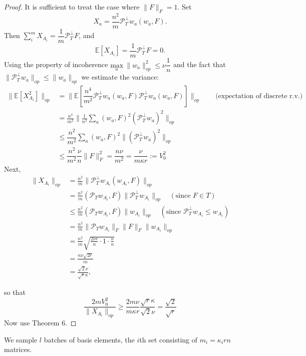 \documentclass{article}
\begin{document}
\begin{proof}
It is sufficient to treat the case where $\|F\|_F=1$. Set
\[
X_a = \dfrac{n^2}{m}\mathcal{P}_T^\perp w_a(w_a,F).
\]
Then $\sum_i^m X_{A_i} = \dfrac{1}{m}\mathcal{P}_T^\perp F$, and
\[
\mathbb{E}[X_{A_i}] =  \dfrac{1}{m}\mathcal{P}_T^\perp F=0.
\]
Using the property of incoherence $\underset{a} {\mathrm{max}} ~\|w_a\|_{op}^2 \le \nu \dfrac{1}{n}$ and the fact that $\|\mathcal{P}_T^\perp w_a\|_{op} \le \|w_a\|_{op}$ we estimate the variance:
\begin{equation}
\begin{aligned}
\|\mathbb{E}[X_{A_i}^2]\|_{op} &=\|\mathbb{E}[\dfrac{n^4}{m^2}\mathcal{P}_T^\perp w_a(w_a,F)\mathcal{P}_T^\perp w_a(w_a,F)]\|_{op}\qquad \text{(expectation of discrete r.v.)}\\
& = \frac{n^4}{m^2}\|\frac{1}{n^2}\sum_a(w_a,F)^2(\mathcal{P}_T^\perp w_a)^2\|_{op}\\
& \le \dfrac{n^2}{m^2}\sum_a(w_a,F)^2\|(\mathcal{P}_T^\perp w_a)^2\|_{op} \\
& \le \dfrac{n^2}{m^2}\dfrac{\nu}{n}\|F\|_F^2 = \dfrac{n\nu}{m^2} = \dfrac{\nu}{m\kappa r} := V_0^2
\end{aligned}
\label{eq:37}
\end{equation}
Next,
\begin{equation}
\begin{aligned}
\|X_{A_i}\|_{op} &= \frac{n^2}{m}\|\mathcal{P}_T^\perp w_{A_i}(w_{A_i},F)\|_{op}\\
&=\frac{n^2}{m}(\mathcal{P}_T w_{A_i},F)\|\mathcal{P}_T^\perp w_{A_i}\|_{op} \quad (\text{since }F\in T)\\
&\le\frac{n^2}{m}(\mathcal{P}_T w_{A_i},F)\|w_{A_i}\|_{op} \quad (\text{since }\mathcal{P}_T^\perp w_{A_i} \le w_{A_i})\\
&=\frac{n^2}{m}\|\mathcal{P}_T w_{A_i}\|_F\|F\|_F\|w_{A_i}\|_{op}\\
&= \frac{n^2}{m}\sqrt{\frac{2\nu r}{n}\cdot 1\cdot \frac{\nu}{n}}\\
&=\frac{n\nu \sqrt{2r}}{m} \\
&= \frac{\sqrt{2}\nu}{\sqrt{r}\kappa},
\end{aligned}
\end{equation}

so that
\[
\frac{2mV_0^2}{\|X_{A_i}\|_{op}}\ge \frac{2m\nu}{m\kappa r}\frac{\sqrt{r} \kappa}{\sqrt{2}\nu} = \frac{\sqrt{2}}{\sqrt{r}}
\]
Now use Theorem 6.
\end{proof}

We sample $l$ batches of basis elements, the $i$th set consisting of $m_i=\kappa_i rn$ matrices.
\end{document}
